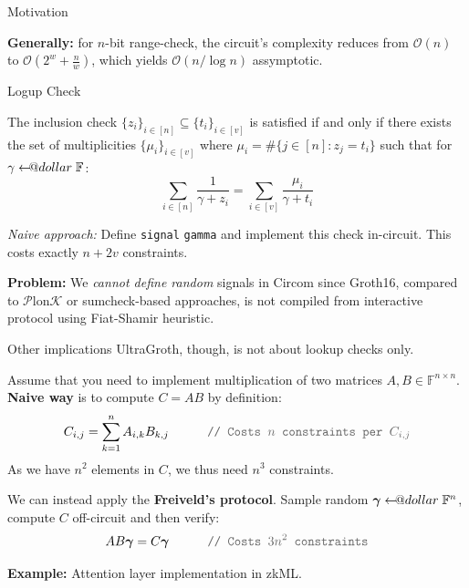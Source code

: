 \documentclass{zkdl-presentation-template}
\makeatletter
\newcommand\leftarrowS{\leftarrow\joinrel\smalldollar}
\newcommand{\smalldollar}{\mathrel{\mathpalette\small@dollar\relax}}
\newcommand{\small@dollar}[2]{%
  \vcenter{\hbox{%
    $#1\textnormal{\fontsize{0.7\dimexpr\f@size pt}{0}\selectfont\$}$%
  }}%
}
\makeatother
\begin{document}
\begin{frame}{Motivation}
\begin{tikzpicture}
        \end{tikzpicture}

        \textbf{Generally:} for $n$-bit range-check, the circuit's complexity
        reduces from $\mathcal{O}(n)$ to $\mathcal{O}(2^w + \frac{n}{w})$, which
        yields $\mathcal{O}(n/\log n)$ assymptotic.
    \end{frame}

    \begin{frame}{Logup Check}
        \begin{theorem}
            The inclusion check $\{z_i\}_{i \in [n]} \subseteq \{t_i\}_{i \in
            [v]}$ is satisfied if and only if there exists the set of
            multiplicities $\{\mu_i\}_{i \in [v]}$ where $\mu_i = \#\{j \in [n]:
            z_j = t_i\}$ such that for $\gamma \leftarrowS \mathbb{F}$:
            \begin{equation*}
                \sum_{i \in [n]} \frac{1}{\gamma + z_i} = \sum_{i \in [v]} \frac{\mu_i}{\gamma + t_i}
            \end{equation*}
        \end{theorem}

        \textit{Naive approach:} Define \texttt{\textcolor{blue!70!black}{signal}} \texttt{gamma} and implement this check
        in-circuit. This costs exactly $n + 2v$ constraints.

        \textcolor{red!70!black}{\textbf{Problem:}} We \textit{cannot define
        random} signals in Circom since Groth16, compared to
        $\mathcal{P}$lon$\mathcal{K}$ or sumcheck-based approaches, is not
        compiled from interactive protocol using Fiat-Shamir heuristic.
    \end{frame}

    \begin{frame}{Other implications}
        UltraGroth, though, is not about lookup checks only.

        Assume that you need to implement multiplication of two matrices $A,B
        \in \mathbb{F}^{n \times n}$. \textbf{Naive way} is to compute $C=AB$ by definition:
        \begin{equation*}
            C_{i,j} = \sum_{k=1}^n A_{i,k}B_{k,j} \hspace{30px} \textcolor{gray!80!black}{\texttt{// Costs $n$ constraints per $C_{i,j}$}}
        \end{equation*}
        As we have $n^2$ elements in $C$, we thus need $n^3$ constraints.

        We can instead apply the \textbf{Freiveld's protocol}. Sample random 
        $\boldsymbol{\gamma} \leftarrowS \mathbb{F}^n$, compute $C$ off-circuit 
        and then verify:
        \begin{equation*}
            AB\boldsymbol{\gamma} = C\boldsymbol{\gamma} \hspace{30px} \textcolor{gray!80!black}{\texttt{// Costs $3n^2$ constraints}}
        \end{equation*} 

        \textbf{Example:} Attention layer implementation in zkML.
    \end{frame}
\end{document}
